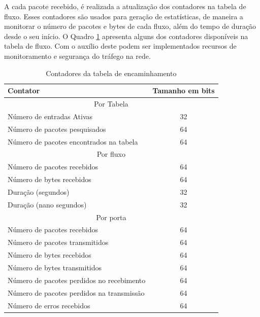 A cada pacote recebido, é realizada a atualização dos contadores na tabela de fluxo.
Esses contadores são usados para geração de estatísticas, de maneira a monitorar o número de pacotes e bytes de cada fluxo, além do tempo de duração desde o seu início. O Quadro \ref{tab:contadores} apresenta alguns dos contadores disponíveis na tabela de fluxo. Com o auxílio deste podem ser implementados recursos de monitoramento e segurança do tráfego na rede.

\begin{table}[H]
  \centering
  \caption{Contadores da tabela de encaminhamento}
  \begin{tabular}{|l|c|} \hline
	\textbf{Contator} & \textbf{Tamanho em bits} \\ \hline
	\multicolumn{2}{|c|}{Por Tabela} \\ \hline
	Número de entradas Ativas & 32 \\ \hline
	Número de pacotes pesquisados & 64 \\ \hline
	Número de pacotes encontrados na tabela & 64 \\ \hline
	\multicolumn{2}{|c|}{Por fluxo} \\ \hline
	Número de pacotes recebidos & 64 \\ \hline
	Número de bytes recebidos & 64 \\ \hline
	Duração (segundos) & 32 \\ \hline
	Duração (nano segundos) & 32 \\ \hline
	\multicolumn{2}{|c|}{Por porta} \\ \hline
	Número de pacotes recebidos & 64 \\ \hline
	Número de pacotes transmitidos & 64 \\ \hline
	Número de bytes recebidos & 64 \\ \hline
	Número de bytes transmitidos & 64 \\ \hline
	Número de pacotes perdidos no recebimento & 64 \\ \hline
	Número de pacotes perdidos na transmissão & 64 \\ \hline
	Número de erros recebidos & 64 \\ \hline
  \end{tabular}
  \label{tab:contadores}
\end{table}

